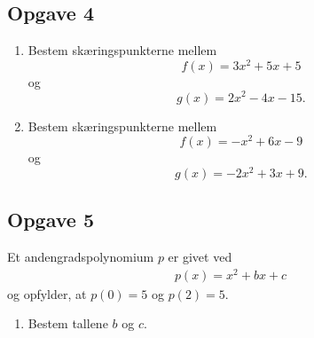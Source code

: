 \subsection*{Opgave 4}
\begin{enumerate}
	\item Bestem skæringspunkterne mellem 
	$$f(x) = 3x^2 + 5x + 5$$ 
	og
	$$g(x) = 2x^2 -4x -15.$$
	\item Bestem skæringspunkterne mellem
	 $$f(x) = -x^2 + 6x -9$$
	 og 
	 $$g(x) = -2x^2 + 3x + 9.$$
\end{enumerate}

\subsection*{Opgave 5}
Et andengradspolynomium $p$ er givet ved
\begin{align*}
	p(x) = x^2 + bx +c 
\end{align*}
og opfylder, at $p(0) = 5$ og $p(2) = 5$.
\begin{enumerate}[label=\roman*)]
	\item Bestem tallene $b$ og $c$. 
\end{enumerate}
